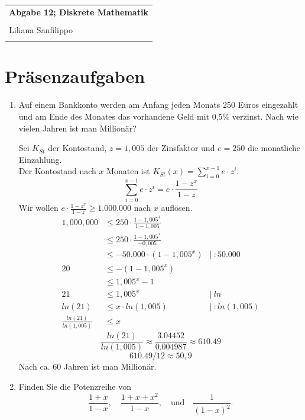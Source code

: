 \documentclass{article} %
\newcommand{\titulo}{Abgabe 12; Diskrete Mathematik}
\newcommand{\nombre}{Liliana Sanfilippo}
\begin{document}
\begin{tabular}{p{12cm}}
{{\Large\bf\titulo}}\\
\vspace{0.2cm}\\
 {\large\nombre}\\
 \vspace{0.1cm}
\end{tabular}


\section*{Präsenzaufgaben}

\begin{enumerate}
    \item Auf einem Bankkonto werden am Anfang jeden Monats 250 Euros eingezahlt und am Ende des Monates das vorhandene Geld mit 0,5\% verzinst. Nach wie vielen Jahren ist man Millionär?
    \begin{mybox}
    Sei $K_{St}$ der Kontostand, $z = 1,005$ der Zinsfaktor und $e = 250$ die monatliche Einzahlung. \\
    Der Kontostand nach $x$ Monaten ist $K_{St}(x) = \sum_{i=0}^{x-1} e \cdot z^i$.  
    \[
    \sum_{i=0}^{x-1} e \cdot z^i =  e \cdot \frac{1-z^x}{1-z}
    \]
    Wir wollen \(e \cdot \frac{1-z^x}{1-z} \geq 1.000.000 \) nach $x$ auflösen. 
    \begin{align*}
      1,000,000 & \leq   250 \cdot \frac{1-1,005^x}{1-1,005} \\
                & \leq   250 \cdot \frac{1-1,005^x}{-0,005} \\
                & \leq   -50.000 \cdot (1-1,005^x) & | \ :50.000\\
         20     & \leq  -(1-1,005^x) \\
                & \leq  1,005^x - 1\\
         21     & \leq  1,005^x & | \ ln \\
         ln(21) & \leq x \cdot ln(1,005) & | \ : ln(1,005) \\
         \frac{ln(21)}{ln(1,005)} & \leq x   
    \end{align*}
    \[ \frac{ln(21)}{ln(1,005)} \approx \frac{3.04452}{0.004987} \approx 610.49\]
    \[610.49 / 12 \approx 50,9\]
    Nach ca. 60 Jahren ist man Millionär. 
    \end{mybox}
    \item Finden Sie die Potenzreihe von
    \[
    \frac{1 + x}{1 - x}, \quad \frac{1 + x + x^2}{1 - x}, \quad \text{und} \quad \frac{1}{(1 - x)^2}.
\]
\end{enumerate}
\end{document}
